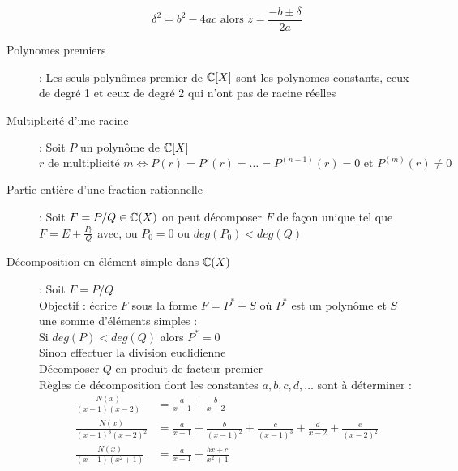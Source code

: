 \begin{description}
    \[
        \delta^2=b^2-4ac
        \textrm{ alors }
        z=\frac{-b\pm\delta}{2a}
    \]
\item[Polynomes premiers] : Les seuls polynômes premier de $\mathbb{C}[X]$ sont les polynomes constants, ceux de degré 1
    et ceux de degré 2 qui n’ont pas de racine réelles
\item[Multiplicité d’une racine] : Soit $P$ un polynôme de $\mathbb{C}[X]$
    \[
        r\textrm{ de multiplicité }m
        \Leftrightarrow
        P(r)=P'(r)=\dots =P^{(n-1)}(r)=0
        \textrm{ et }
        P^{(m)}(r)\ne 0
    \]
\item[Partie entière d’une fraction rationnelle] :
    Soit $F = P/Q \in \mathbb{C}(X)$ on peut décomposer $F$ de façon unique
    tel que $F = E + \frac{P_0}{Q}$ avec, ou $P_0 = 0$ ou $deg(P_0 ) < deg(Q)$
\item[Décomposition en élément simple dans $\mathbb{C}(X)$] : Soit $F = P/Q$
    \\Objectif : écrire $F$ sous la forme $F = P^* + S$ où $P^*$ est un polynôme et $S$ une somme d’éléments simples :
    \\Si $deg(P ) < deg(Q)$ alors $P^* = 0$
    \\Sinon effectuer la division euclidienne
    \\Décomposer $Q$ en produit de facteur premier
    \\Règles de décomposition dont les constantes $a, b, c, d, \dots$ sont à déterminer :
    \begin{align*}
        \frac{N(x)}{(x-1)(x-2)}&=\frac{a}{x-1}+\frac{b}{x-2}\\
        \frac{N(x)}{(x-1)^3(x-2)^2}&=
            \frac{a}{x-1}
            +\frac{b}{(x-1)^2}
            +\frac{c}{(x-1)^3}
            +\frac{d}{x-2}
            +\frac{e}{(x-2)^2}\\
        \frac{N(x)}{(x-1)(x^2+1)}&=
            \frac{a}{x-1}
            +\frac{bx+c}{x^2+1}
    \end{align*}
\end{description}